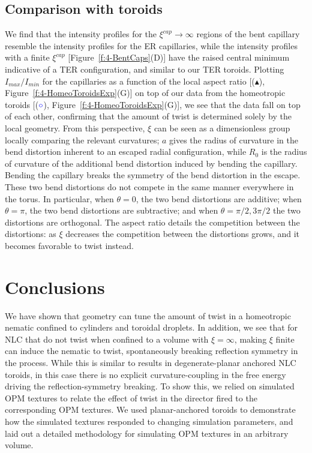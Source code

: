 \subsection{Comparison with toroids}
We find that the intensity profiles for the $\xi^{cap} \rightarrow \infty$ regions of the bent capillary resemble the intensity profiles for the ER capillaries, while the intensity profiles with a finite $\xi^{cap}$ [Figure~\ref{f:4-BentCaps}(D)] have the raised central minimum indicative of a TER configuration, and similar to our TER toroids.
Plotting $I_{max}/I_{min}$ for the capillaries as a function of the local aspect ratio [($\blacktriangle$), Figure~\ref{f:4-HomeoToroidsExp}(G)] on top of our data from the homeotropic toroids [(${\color{blue} \circ}$), Figure~\ref{f:4-HomeoToroidsExp}(G)], we see that the data fall on top of each other, confirming that the amount of twist is determined solely by the local geometry.
From this perspective, $\xi$ can be seen as a dimensionless group locally comparing the relevant curvatures; $a$ gives the radius of curvature in the bend distortion inherent to an escaped radial configuration, while $R_0$ is the radius of curvature of the additional bend distortion induced by bending the capillary.
Bending the capillary breaks the symmetry of the bend distortion in the escape.
These two bend distortions do not compete in the same manner everywhere in the torus.
In particular, when $\theta = 0$, the two bend distortions are additive; when $\theta = \pi$, the two bend distortions are subtractive; and when $\theta = \pi/2,3\pi/2$ the two distortions are orthogonal.
The aspect ratio details the competition between the distortions: as $\xi$ decreases the competition between the distortions grows, and it becomes favorable to twist instead.


\section{Conclusions}
We have shown that geometry can tune the amount of twist in a homeotropic nematic confined to cylinders and toroidal droplets.
In addition, we see that for NLC that do not twist when confined to a volume with $\xi = \infty$, making $\xi$ finite can induce the nematic to twist, spontaneously breaking reflection symmetry in the process.
While this is similar to results in degenerate-planar anchored NLC toroids, in this case there is no explicit curvature-coupling in the free energy driving the reflection-symmetry breaking.
To show this, we relied on simulated OPM textures to relate the effect of twist in the director fired to the corresponding OPM textures.
We used planar-anchored toroids to demonstrate how the simulated textures responded to changing simulation parameters, and laid out a detailed methodology for simulating OPM textures in an arbitrary volume.

